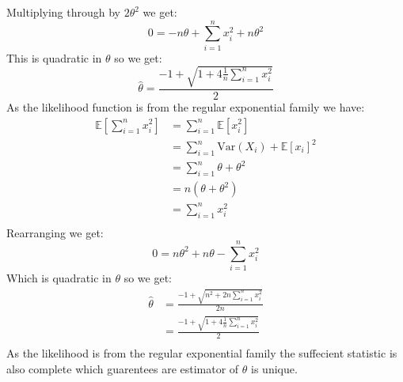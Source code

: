 \documentclass{article}
\begin{document}
Multiplying through by $2\theta^2$ we get:
$$0=-n\theta+\sum_{i=1}^{n}x_i^2+n\theta^2$$
This is quadratic in $\theta$ so we get:
$$\hat{\theta}=\frac{-1+\sqrt{1+4\frac{1}{n}\sum_{i=1}^nx_i^2}}{2}$$
As the likelihood function is from the regular exponential family we have:
\begin{align*}
\mathbb{E}\left[\sum_{i=1}^nx_i^2\right]&=\sum_{i=1}^n\mathbb{E}\left[x_i^2\right]\\
&=\sum_{i=1}^n\text{Var}(X_i)+\mathbb{E}\left[x_i\right]^2\\
&=\sum_{i=1}^n\theta+\theta^2\\
&=n(\theta+\theta^2)\\
&=\sum_{i=1}^nx_i^2\\
\end{align*}
Rearranging we get:
$$0=n\theta^2+n\theta-\sum_{i=1}^nx_i^2$$
Which is quadratic in $\theta$ so we get:
\begin{align*}
\hat{\theta}&=\frac{-1+\sqrt{n^2+2n\sum_{i=1}^nx_i^2}}{2n}\\
&=\frac{-1+\sqrt{1+4\frac{1}{n}\sum_{i=1}^nx_i^2}}{2}\\
\end{align*}
As the likelihood is from the regular exponential family the suffecient statistic is also complete which guarentees are estimator of $\theta$ is unique. 
\end{document}
